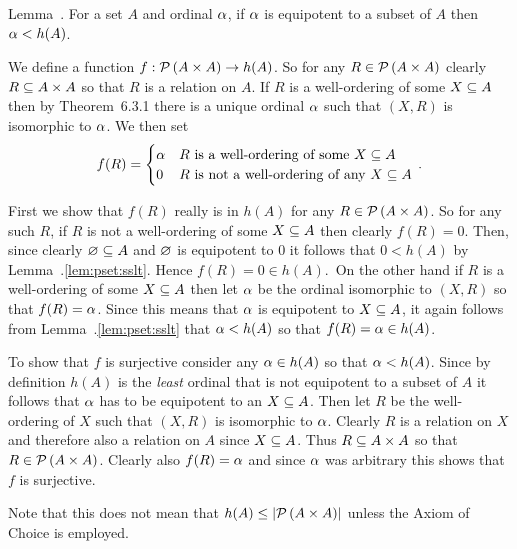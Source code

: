 \begin{solution}
    \begin{statement}{Lemma~\ex.}
        For a set $A$ and ordinal $\a$, if $\a$ is equipotent to a subset of $A$ then $\a < h(A)$.
    \end{statement}


    \mainprob

	We define a function $f : \pset{A \times A} \to h(A)$.
    So for any $R \in \pset{A \times A}$ clearly $R \ss A \times A$ so that $R$ is a relation on $A$.
    If $R$ is a well-ordering of some $X \ss A$ then by Theorem~6.3.1 there is a unique ordinal $\a$ such that $(X, R)$ is isomorphic to $\a$.
    We then set
    $$
    f(R) = \begin{cases}
         \a & \text{$R$ is a well-ordering of some $X \ss A$} \\
         0 & \text{$R$ is not a well-ordering of any $X \ss A$} \\
    \end{cases} \,.
    $$

    First we show that $f(R)$ really is in $h(A)$ for any $R \in \pset{A \times A}$.
    So for any such $R$, if $R$ is not a well-ordering of some $X \ss A$ then clearly $f(R) = 0$.
    Then, since clearly $\es \ss A$ and $\es$ is equipotent to 0 it follows that $0 < h(A)$ by Lemma~\ex.\ref{lem:pset:sslt}.
    Hence $f(R) = 0 \in h(A)$.\
    On the other hand if $R$ is a well-ordering of some $X \ss A$ then let $\a$ be the ordinal isomorphic to $(X,R)$ so that $f(R) = \a$.
    Since this means that $\a$ is equipotent to $X \ss A$, it again follows from Lemma~\ex.\ref{lem:pset:sslt} that $\a < h(A)$ so that $f(R) = \a \in h(A)$.

    To show that $f$ is surjective consider any $\a \in h(A)$ so that $\a < h(A)$.
    Since by definition $h(A)$ is the \emph{least} ordinal that is not equipotent to a subset of $A$ it follows that $\a$ has to be equipotent to an $X \ss A$.
    Then let $R$ be the well-ordering of $X$ such that $(X,R)$ is isomorphic to $\a$.
    Clearly $R$ is a relation on $X$ and therefore also a relation on $A$ since $X \ss A$.
    Thus $R \ss A \times A$ so that $R \in \pset{A \times A}$.
    Clearly also $f(R) = \a$ and since $\a$ was arbitrary this shows that $f$ is surjective. \qedsymbol

    Note that this does not mean that $h(A) \leq \abs{\pset{A \times A}}$ unless the Axiom of Choice is employed.
\end{solution}

